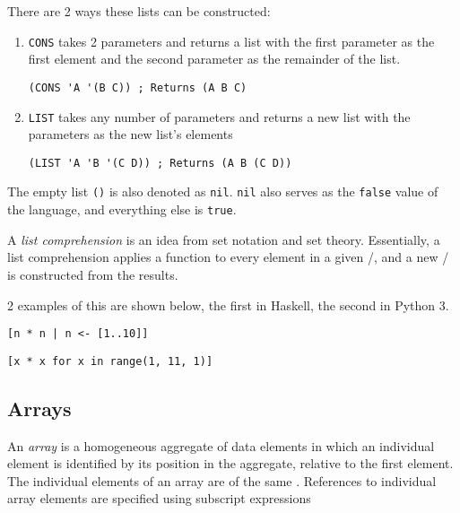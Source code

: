 There are 2 ways these lists can be constructed:
\begin{enumerate}[noitemsep]
\item \texttt{CONS} takes 2 parameters and returns a list with the first parameter as the first element and the second parameter as the remainder of the list.
\begin{verbatim}
(CONS 'A '(B C)) ; Returns (A B C)
\end{verbatim}
\item \texttt{LIST} takes any number of parameters and returns a new list with the parameters as the new list's elements
\begin{verbatim}
(LIST 'A 'B '(C D)) ; Returns (A B (C D))
\end{verbatim}
\end{enumerate}

The empty list \texttt{()} is also denoted as \texttt{nil}.
\texttt{nil} also serves as the \texttt{false} value of the language, and everything else is \texttt{true}.

\begin{definition}\label{def:List_Comprehension}
  A \emph{list comprehension} is an idea from set notation and set theory.
  Essentially, a list comprehension applies a function to every element in a given /, and a new / is constructed from the results.

  2 examples of this are shown below, the first in Haskell, the second in Python 3.
\begin{verbatim}
[n * n | n <- [1..10]]
\end{verbatim}
\begin{verbatim}
[x * x for x in range(1, 11, 1)]
\end{verbatim}
\end{definition}
\subsection{Arrays}\label{subsec:Arrays}
\begin{definition}[Array]\label{def:Array}
  An \emph{array} is a homogeneous aggregate of data elements in which an individual element is identified by its position in the aggregate, relative to the first element.
  The individual elements of an array are of the same .
  References to individual array elements are specified using subscript expressions
\end{definition}


